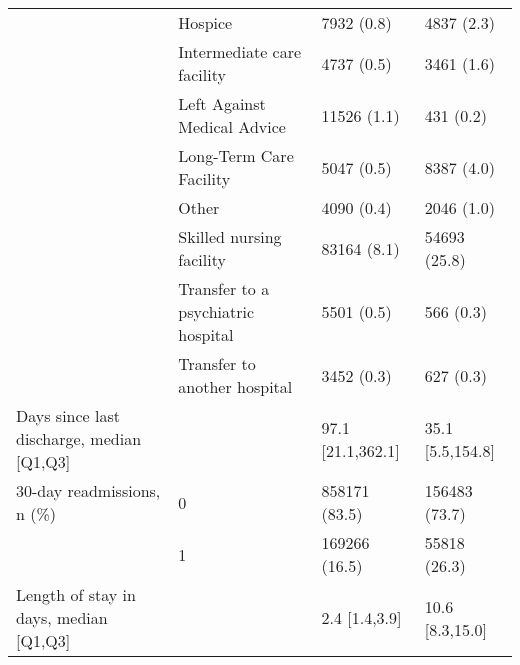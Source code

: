 \begin{tabular}{llll}
                                       & Hospice &                            7932 (0.8) &        4837 (2.3) \\
                                       & Intermediate care facility &                            4737 (0.5) &        3461 (1.6) \\
                                       & Left Against Medical Advice &                           11526 (1.1) &         431 (0.2) \\
                                       & Long-Term Care Facility &                            5047 (0.5) &        8387 (4.0) \\
                                       & Other &                            4090 (0.4) &        2046 (1.0) \\
                                       & Skilled nursing facility &                           83164 (8.1) &      54693 (25.8) \\
                                       & Transfer to a psychiatric hospital &                            5501 (0.5) &         566 (0.3) \\
                                       & Transfer to another hospital &                            3452 (0.3) &         627 (0.3) \\
Days since last discharge, median [Q1,Q3] &   &                     97.1 [21.1,362.1] &  35.1 [5.5,154.8] \\
30-day readmissions, n (\%) & 0 &                         858171 (83.5) &     156483 (73.7) \\
                                       & 1 &                         169266 (16.5) &      55818 (26.3) \\
Length of stay in days, median [Q1,Q3] &   &                         2.4 [1.4,3.9] &   10.6 [8.3,15.0] \\
\bottomrule
\end{tabular}

